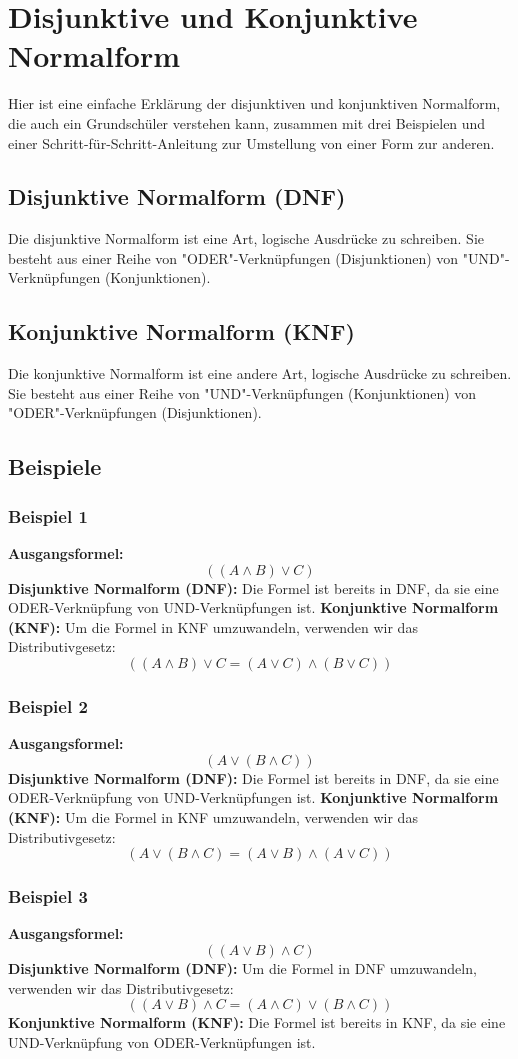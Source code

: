 \documentclass{article}
\begin{document}
\section*{Disjunktive und Konjunktive Normalform}
Hier ist eine einfache Erklärung der disjunktiven und konjunktiven Normalform, die auch ein Grundschüler verstehen kann, zusammen mit drei Beispielen und einer Schritt-für-Schritt-Anleitung zur Umstellung von einer Form zur anderen.
\subsection*{Disjunktive Normalform (DNF)}
Die disjunktive Normalform ist eine Art, logische Ausdrücke zu schreiben. Sie besteht aus einer Reihe von "ODER"-Verknüpfungen (Disjunktionen) von "UND"-Verknüpfungen (Konjunktionen).\\
\subsection*{Konjunktive Normalform (KNF)}
Die konjunktive Normalform ist eine andere Art, logische Ausdrücke zu schreiben. Sie besteht aus einer Reihe von "UND"-Verknüpfungen (Konjunktionen) von "ODER"-Verknüpfungen (Disjunktionen).\\
\subsection*{Beispiele}
\subsubsection*{Beispiel 1}
\textbf{Ausgangsformel:}
\[
( (A \land B) \lor C )
\]
\textbf{Disjunktive Normalform (DNF):}
Die Formel ist bereits in DNF, da sie eine ODER-Verknüpfung von UND-Verknüpfungen ist.
\textbf{Konjunktive Normalform (KNF):}
Um die Formel in KNF umzuwandeln, verwenden wir das Distributivgesetz: 
\[
( (A \land B) \lor C = (A \lor C) \land (B \lor C) )
\]
\subsubsection*{Beispiel 2}
\textbf{Ausgangsformel:}
\[
( A \lor (B \land C) )
\]
\textbf{Disjunktive Normalform (DNF):}
Die Formel ist bereits in DNF, da sie eine ODER-Verknüpfung von UND-Verknüpfungen ist.
\textbf{Konjunktive Normalform (KNF):}
Um die Formel in KNF umzuwandeln, verwenden wir das Distributivgesetz: 
\[
( A \lor (B \land C) = (A \lor B) \land (A \lor C) )
\]
\subsubsection*{Beispiel 3}
\textbf{Ausgangsformel:}
\[
( (A \lor B) \land C )
\]
\textbf{Disjunktive Normalform (DNF):}
Um die Formel in DNF umzuwandeln, verwenden wir das Distributivgesetz: 
\[
( (A \lor B) \land C = (A \land C) \lor (B \land C) )
\]
\textbf{Konjunktive Normalform (KNF):}
Die Formel ist bereits in KNF, da sie eine UND-Verknüpfung von ODER-Verknüpfungen ist.
\end{document}
